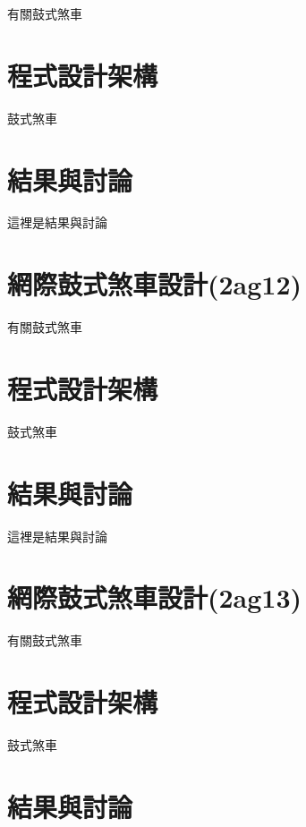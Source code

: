 \documentclass[]{article}
\begin{document}
有關鼓式煞車

\section{程式設計架構}\label{ux7a0bux5f0fux8a2dux8a08ux67b6ux69cb-7}

鼓式煞車

\section{結果與討論}\label{ux7d50ux679cux8207ux8a0eux8ad6-8}

這裡是結果與討論

\section{網際鼓式煞車設計(2ag12)}\label{ux7db2ux969bux9f13ux5f0fux715eux8ecaux8a2dux8a082ag12}

有關鼓式煞車

\section{程式設計架構}\label{ux7a0bux5f0fux8a2dux8a08ux67b6ux69cb-8}

鼓式煞車

\section{結果與討論}\label{ux7d50ux679cux8207ux8a0eux8ad6-9}

這裡是結果與討論

\section{網際鼓式煞車設計(2ag13)}\label{ux7db2ux969bux9f13ux5f0fux715eux8ecaux8a2dux8a082ag13}

有關鼓式煞車

\section{程式設計架構}\label{ux7a0bux5f0fux8a2dux8a08ux67b6ux69cb-9}

鼓式煞車

\section{結果與討論}\label{ux7d50ux679cux8207ux8a0eux8ad6-10}
\end{document}

